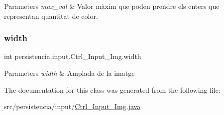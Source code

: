 \begin{DoxyParams}{Parameters}
{\em max\+\_\+val} & Valor màxim que poden prendre els enters que representan quantitat de color. \\
\hline
\end{DoxyParams}
\mbox{\label{classpersistencia_1_1input_1_1Ctrl__Input__Img_a51dd0b9243b854aa25ac4532acca4524}} 
\subsubsection{\texorpdfstring{width}{width}}
{\footnotesize\ttfamily int persistencia.\+input.\+Ctrl\+\_\+\+Input\+\_\+\+Img.\+width\hspace{0.3cm}{\ttfamily [package]}}


\begin{DoxyParams}{Parameters}
{\em width} & Amplada de la imatge \\
\hline
\end{DoxyParams}


The documentation for this class was generated from the following file\+:\begin{DoxyCompactItemize}
\item 
src/persistencia/input/\hyperlink{Ctrl__Input__Img_8java}{Ctrl\+\_\+\+Input\+\_\+\+Img.\+java}\end{DoxyCompactItemize}
